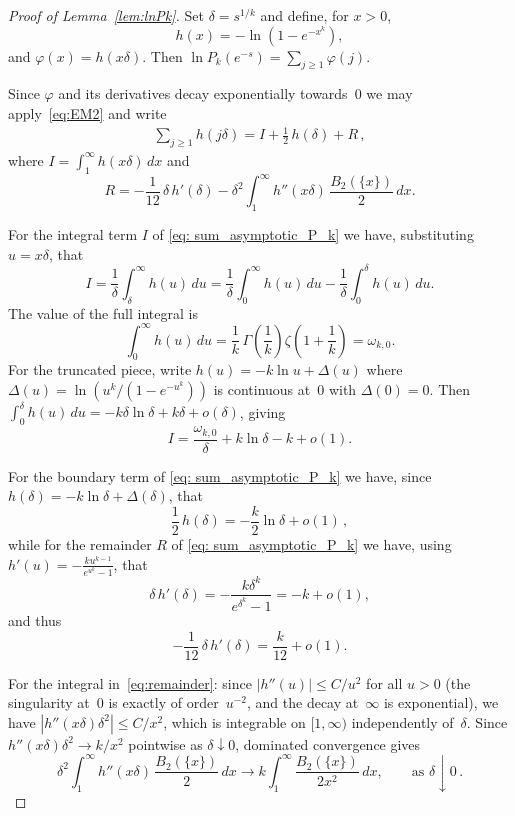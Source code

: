 \documentclass[12pt]{amsart}
\theoremstyle{definition}
\begin{document}
\begin{proof}[Proof of Lemma~\ref{lem:lnPk}]
Set $\delta = s^{1/k}$ and define, for $x>0$,
\[
h(x) = -\ln(1-e^{-x^k}),
\]
and $\varphi(x) = h(x\delta)$. Then $\ln P_k(e^{-s}) = \sum_{j\ge 1} \varphi(j)$.

Since $\varphi$ and its derivatives decay exponentially towards~$0$ we may apply~\eqref{eq:EM2} and
write
\begin{align}\label{eq: sum_asymptotic_P_k}
\sum_{j\ge 1} h(j\delta) = I + \frac{1}{2}\, h(\delta) + R\,,
\end{align}
where $I = \int_1^{\infty} h(x\delta)\, dx$ and
\begin{equation}\label{eq:remainder}
R = -\frac{1}{12}\,\delta\, h'(\delta) - \delta^2 \int_1^{\infty} h''(x\delta)\,\frac{B_2(\{x\})}{2}\, dx.
\end{equation}

\medskip

For the integral term $I$ of \eqref{eq: sum_asymptotic_P_k} we have, substituting $u=x\delta$, that
\[
I = \frac{1}{\delta}\int_{\delta}^{\infty} h(u)\, du = \frac{1}{\delta}\int_0^{\infty} h(u)\, du - \frac{1}{\delta}\int_0^{\delta} h(u)\, du.
\]
The value of the full integral is
\[
\int_0^{\infty} h(u)\, du = \frac{1}{k}\,\Gamma\!\left(\frac{1}{k}\right)\zeta\!\left(1+\frac{1}{k}\right) = \omega_{k,0}.
\]
For the truncated piece, write $h(u) = -k\ln u + \Delta(u)$ where $\Delta(u) = \ln({u^k}/(1-e^{-u^k}))$
is continuous at~$0$ with $\Delta(0)=0$. Then $\int_0^{\delta} h(u)\, du = -k\delta\ln\delta + k\delta + o(\delta)$, giving
\[
I = \frac{\omega_{k,0}}{\delta} + k\ln\delta - k + o(1).
\]

\medskip

For the boundary term of \eqref{eq: sum_asymptotic_P_k} we have, since $h(\delta) = -k\ln\delta + \Delta(\delta)$, that 
\[
\frac{1}{2}\, h(\delta) = -\frac{k}{2}\ln\delta + o(1)\,,
\]
while for the remainder $R$ of \eqref{eq: sum_asymptotic_P_k} we have, using $h'(u) = -\frac{k u^{k-1}}{e^{u^k}-1}$, that
\[
\delta\, h'(\delta) = -\frac{k\delta^k}{e^{\delta^k}-1} = -k + o(1),
\]
and thus
\[
-\frac{1}{12}\,\delta\, h'(\delta) = \frac{k}{12} + o(1).
\]

For the integral in~\eqref{eq:remainder}: since $|h''(u)|\le C/u^2$ for all $u>0$ (the singularity at~$0$ is
exactly of order~$u^{-2}$, and the decay at~$\infty$ is exponential), we have $|h''(x\delta)\delta^2| \le C/x^2$,
which is integrable on $[1,\infty)$ independently of~$\delta$. Since $h''(x\delta)\delta^2 \to k/x^2$ pointwise as
$\delta\downarrow 0$, dominated convergence gives
\[
\delta^2 \int_1^{\infty} h''(x\delta)\,\frac{B_2(\{x\})}{2}\, dx \longrightarrow k\int_1^{\infty} \frac{B_2(\{x\})}{2x^2}\, dx, \qquad \text{as } \delta\downarrow 0\,.
\]


\end{proof}
\end{document}
